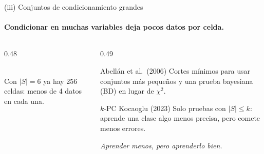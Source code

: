 \documentclass[aspectratio=169,11pt]{beamer}
\begin{document}
\begin{frame}[t]{(iii) Conjuntos de condicionamiento grandes}
  \framesubtitle{Condicionar en muchas variables deja pocos datos por celda.}
  \begin{columns}[T,onlytextwidth]
    \begin{column}{0.48\textwidth}
      \centering
      \\[0.1cm]
      {\small Con $|S|=6$ ya hay 256 celdas: menos de 4 datos en cada una.}
    \end{column}
    \begin{column}{0.49\textwidth}
      \begin{block}{Abellán et al.\ (2006)}
        Cortes mínimos para usar conjuntos más pequeños y una prueba bayesiana
        (BD) en lugar de $\chi^2$.
      \end{block}
      \begin{block}{$k$-PC \textperiodcentered{} Kocaoglu (2023)}
        Solo pruebas con $|S|\le k$: aprende una clase algo menos precisa,
        pero comete menos errores.
      \end{block}
      {\small\color{upmgray}\itshape Aprender menos, pero aprenderlo bien.}
    \end{column}
  \end{columns}
\end{frame}
\end{document}
